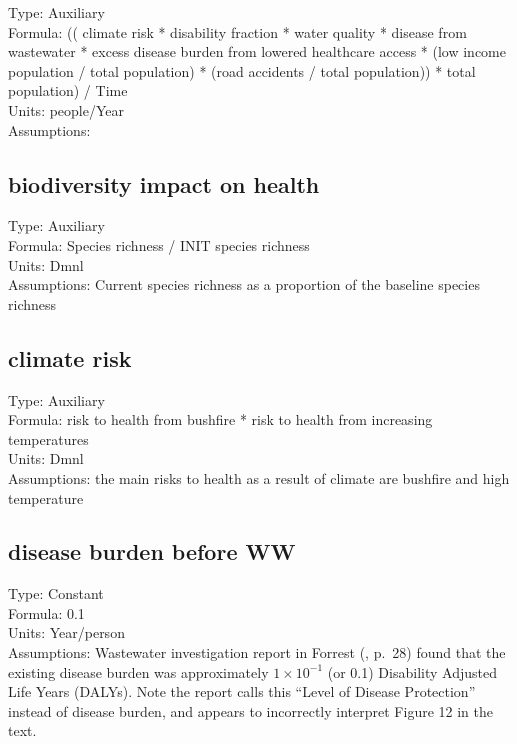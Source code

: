 \documentclass[
  11pt,
]{book}
\begin{document}
Type: Auxiliary\\
Formula: (( climate risk * disability fraction * water quality * disease from wastewater * excess disease burden from lowered healthcare access * (low income population / total population) * (road accidents / total population)) * total population) / Time\\
Units: people/Year\\
Assumptions:

\hypertarget{biodiversity-impact-on-health}{%
\subsection{biodiversity impact on health}\label{biodiversity-impact-on-health}}

Type: Auxiliary\\
Formula: Species richness / INIT species richness\\
Units: Dmnl\\
Assumptions: Current species richness as a proportion of the baseline species richness

\hypertarget{climate-risk}{%
\subsection{climate risk}\label{climate-risk}}

Type: Auxiliary\\
Formula: risk to health from bushfire * risk to health from increasing temperatures\\
Units: Dmnl\\
Assumptions: the main risks to health as a result of climate are bushfire and high temperature

\hypertarget{disease-burden-before-ww}{%
\subsection{disease burden before WW}\label{disease-burden-before-ww}}

Type: Constant\\
Formula: 0.1\\
Units: Year/person\\
Assumptions: Wastewater investigation report in Forrest (\citet{decentralised_water_consulting_forrest_2019}, p.~28) found that the existing disease burden was approximately \(1 \times 10^{-1}\) (or 0.1) Disability Adjusted Life Years (DALYs). Note the \citet{decentralised_water_consulting_forrest_2019} report calls this ``Level of Disease Protection'' instead of disease burden, and appears to incorrectly interpret Figure 12 in the text.
\end{document}

